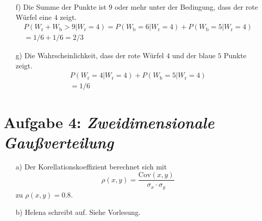 \begin{itemize}
\item[f)] Die Summe der Punkte ist $9$ oder mehr unter der Bedingung, dass der rote Würfel eine $4$ zeigt.
\begin{align*}
P(W_{\text{r}} + W_{\text{b}} > 9|W_{\text{r}} = 4)
= P(W_{\text{b}} = 6|W_{\text{r}} = 4) + P(W_{\text{b}} = 5|W_{\text{r}} = 4)\\
= 1/6 + 1/6 = 2/3 
\end{align*}


\item[g)]Die Wahrscheinlichkeit, dass der rote Würfel $4$ und der blaue $5$ Punkte zeigt.
\begin{align*}
P(W_{\text{r}} = 4|W_{\text{r}} = 4) + P(W_{\text{b}} = 5|W_{\text{r}} = 4)\\
=1/6
\end{align*}
\end{itemize}

\section*{Aufgabe 4: \emph{Zweidimensionale Gaußverteilung}}

\begin{itemize}
\item[a)] Der Korellationskoeffizient berechnet sich mit
\begin{equation}
\rho(x,y)=\frac{\text{Cov}(x,y)}{\sigma_x\cdot\sigma_y}
\end{equation}
zu $\rho(x,y)=0.8.$

\item[b)] Helena schreibt auf. Siehe Vorlesung.


\end{itemize}
